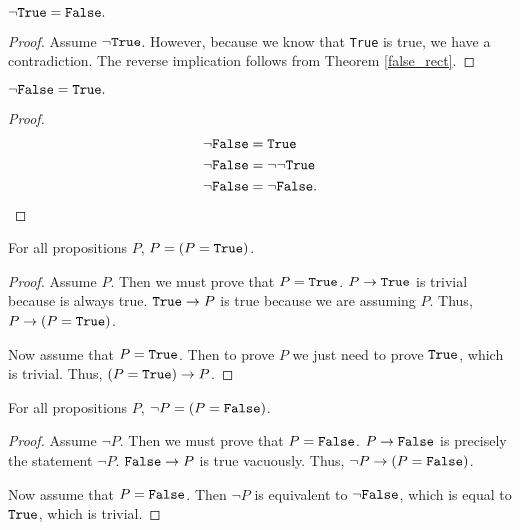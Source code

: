 \documentclass[../../math.tex]{subfiles}
\begin{document}
\begin{theorem} \label{not_true}
    $\neg \verb|True| = \verb|False|.$
\end{theorem}
\begin{proof}
    Assume $\neg \verb|True|$.  However, because we know that \verb|True| is
    true, we have a contradiction.  The reverse implication follows from Theorem
    \ref{false_rect}.
\end{proof}

\begin{theorem} \label{not_false}
    $\neg \verb|False| = \verb|True|.$
\end{theorem}
\begin{proof}
    \begin{align*}
        \neg \vtt{False} &= \vtt{True} \\
        \neg \vtt{False} &= \neg \neg \vtt{True} \\
        \neg \vtt{False} &= \neg \vtt{False}.
    \end{align*}
\end{proof}

\begin{theorem} \label{prop_eq_true}
    For all propositions $P$, $P = (P = \vtt{True})$.
\end{theorem}
\begin{proof}
    Assume $P$.  Then we must prove that $P = \vtt{True}$.  $P \rightarrow
    \vtt{True}$ is trivial because  is always true.  $\vtt{True}
    \rightarrow P$ is true because we are assuming $P$.  Thus, $P \rightarrow (P
    = \vtt{True})$.

    Now assume that $P = \vtt{True}$.  Then to prove $P$ we just need to prove
    $\vtt{True}$, which is trivial.  Thus, $(P = \vtt{True}) \rightarrow P$.
\end{proof}

\begin{theorem} \label{prop_eq_false}
    For all propositions $P$, $\neg P = (P = \vtt{False})$.
\end{theorem}
\begin{proof}
    Assume $\neg P$.  Then we must prove that $P = \vtt{False}$.  $P \rightarrow
    \vtt{False}$ is precisely the statement $\neg P$.  $\vtt{False} \rightarrow
    P$ is true vacuously.  Thus, $\neg P \rightarrow (P = \vtt{False})$.

    Now assume that $P = \vtt{False}$.  Then $\neg P$ is equivalent to $\neg
    \vtt{False}$, which is equal to $\vtt{True}$, which is trivial.
\end{proof}
\end{document}
